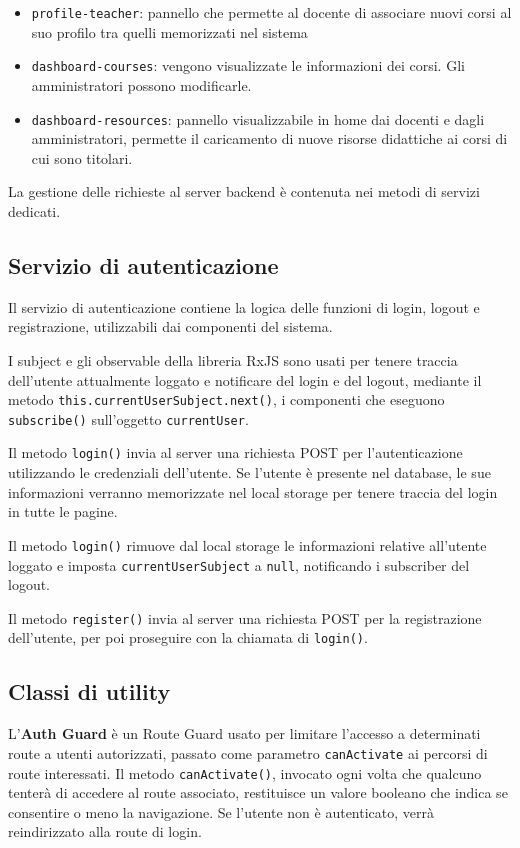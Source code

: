 \begin{itemize}
\begin{itemize}
\end{itemize}
	\item \texttt{profile-teacher}: pannello che permette al docente di associare nuovi corsi al suo profilo tra quelli memorizzati nel sistema
	\item \texttt{dashboard-courses}: vengono visualizzate le informazioni dei corsi. Gli amministratori possono modificarle.
	\item \texttt{dashboard-resources}: pannello visualizzabile in home dai docenti e dagli amministratori, permette il caricamento di nuove risorse didattiche ai corsi di cui sono titolari.
\end{itemize}

La gestione delle richieste al server backend è contenuta nei metodi di servizi dedicati.

\subsection{Servizio di autenticazione}
Il servizio di autenticazione contiene la logica delle funzioni di login, logout e registrazione, utilizzabili dai componenti del sistema.

I subject e gli observable della libreria RxJS sono usati per tenere traccia dell'utente attualmente loggato e notificare del login e del logout, mediante il metodo \texttt{this.currentUserSubject.next()}, i componenti che eseguono \texttt{subscribe()} sull'oggetto \texttt{currentUser}.

Il metodo \texttt{login()} invia al server una richiesta POST per l'autenticazione utilizzando le credenziali dell'utente. Se l'utente è presente nel database, le sue informazioni verranno memorizzate nel local storage per tenere traccia del login in tutte le pagine.

Il metodo \texttt{login()} rimuove dal local storage le informazioni relative all'utente loggato e imposta \texttt{currentUserSubject} a \texttt{null}, notificando i subscriber del logout.

Il metodo \texttt{register()} invia al server una richiesta POST per la registrazione dell'utente, per poi proseguire con la chiamata di \texttt{login()}.

\subsection{Classi di utility}
L'\textbf{Auth Guard} è un Route Guard usato per limitare l'accesso a determinati route a utenti autorizzati, passato come parametro \texttt{canActivate} ai percorsi di route interessati. Il metodo \texttt{canActivate()}, invocato ogni volta che qualcuno tenterà di accedere al route associato, restituisce un valore booleano che indica se consentire o meno la navigazione. Se l’utente non è autenticato, verrà reindirizzato alla route di login.

